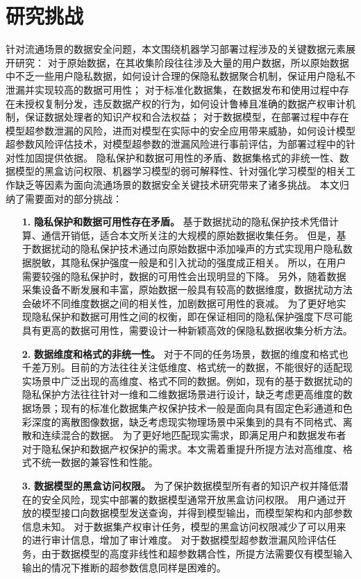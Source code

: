 \section{研究挑战}
针对流通场景的数据安全问题，本文围绕机器学习部署过程涉及的关键数据元素展开研究：
对于原始数据，在其收集阶段往往涉及大量的用户数据，所以原始数据中不乏一些用户隐私数据，如何设计合理的保隐私数据聚合机制，保证用户隐私不泄漏并实现较高的数据可用性；
对于标准化数据集，在数据发布和使用过程中存在未授权复制分发，违反数据产权的行为，如何设计鲁棒且准确的数据产权审计机制，保证数据处理者的知识产权和合法权益；
对于数据模型，在部署过程中存在模型超参数泄漏的风险，进而对模型在实际中的安全应用带来威胁，如何设计模型超参数风险评估技术，对模型超参数的泄漏风险进行事前评估，为部署过程中的针对性加固提供依据。
隐私保护和数据可用性的矛盾、数据集格式的非统一性、数据模型的黑盒访问权限、机器学习模型的弱可解释性、针对强化学习模型的相关工作缺乏等因素为面向流通场景的数据安全关键技术研究带来了诸多挑战。
本文归纳了需要面对的部分挑战：
\begin{itemize}
    \item[\textbf{1.}]\textbf{隐私保护和数据可用性存在矛盾。}
    基于数据扰动的隐私保护技术凭借计算、通信开销低，适合本文所关注的大规模的原始数据收集任务。
    但是，基于数据扰动的隐私保护技术通过向原始数据中添加噪声的方式实现用户隐私数据脱敏，其隐私保护强度一般是和引入扰动的强度成正相关。
    所以，在用户需要较强的隐私保护时，数据的可用性会出现明显的下降。
    另外，随着数据采集设备不断发展和丰富，原始数据一般具有较高的数据维度，数据扰动方法会破坏不同维度数据之间的相关性，加剧数据可用性的衰减。
    为了更好地实现隐私保护和数据可用性之间的权衡，即在保证相同的隐私保护强度下尽可能具有更高的数据可用性，需要设计一种新颖高效的保隐私数据收集分析方法。
    \item[\textbf{2.}]\textbf{数据维度和格式的非统一性。} 
    对于不同的任务场景，数据的维度和格式也千差万别。目前的方法往往关注低维度、格式统一的数据，不能很好的适配现实场景中广泛出现的高维度、格式不同的数据。例如，现有的基于数据扰动的隐私保护方法往往针对一维和二维数据场景进行设计，缺乏考虑更高维度的数据场景；现有的标准化数据集产权保护技术一般是面向具有固定色彩通道和色彩深度的离散图像数据，缺乏考虑现实物理场景中采集到的具有不同格式、离散和连续混合的数据。
    为了更好地匹配现实需求，即满足用户和数据发布者对于隐私保护和数据产权保护的需求。本文需着重提升所提方法对高维度、格式不统一数据的兼容性和性能。
    \item[\textbf{3.}]\textbf{数据模型的黑盒访问权限。} 为了保护数据模型所有者的知识产权并降低潜在的安全风险，现实中部署的数据模型通常开放黑盒访问权限。
    用户通过开放的模型接口向数据模型发送查询，并得到模型输出，而模型架构和内部参数信息未知。
    对于数据集产权审计任务，模型的黑盒访问权限减少了可以用来的进行审计信息，增加了审计难度。
    对于数据模型超参数泄漏风险评估任务，由于数据模型的高度非线性和超参数耦合性，所提方法需要仅有模型输入输出的情况下推断的超参数信息同样是困难的。
\end{itemize}
